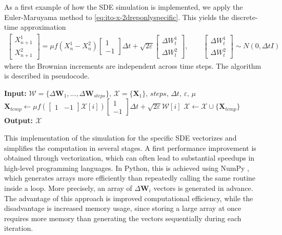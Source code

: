 \documentclass[11pt]{article}
\newcommand{\1}{\mathbbm{1}}
\theoremstyle{plain}
\theoremstyle{definition}
\theoremstyle{remark}
\begin{document}
As a first example of how the SDE simulation is implemented, we apply the Euler-Maruyama method to \eqref{eq:ito-x-2dreponlyspecific}. This yields the discrete-time approximation
\begin{align}
  \begin{bmatrix}
X_{n+1}^1 \\
 X_{n+1}^2
\end{bmatrix} = \mu f( X_n^1-X_n^2)\begin{bmatrix}
1 \\
-1
\end{bmatrix}\Delta t +\sqrt{2 \varepsilon} \begin{bmatrix}
\Delta W_t^1 \\
\Delta W_t^2
\end{bmatrix}  , \qquad \begin{bmatrix}
\Delta W_t^1 \\
\Delta W_t^2
\end{bmatrix} \sim N(0, \Delta t I)
\label{eq:ito-x-2dreponlyspecificEMapprox}
\end{align}
where the Brownian increments are independent across time steps. The algorithm is described in pseudocode. 
\FloatBarrier

\begin{algorithm}[h]
\caption{(Euler–Maruyama for \eqref{eq:ito-x-2dreponlyspecific})}\label{alg:placeholder}
\begin{algorithmic}[1]
\State \textbf{Input:} $\mathcal{W}=\{\Delta \mathbf{W}_1,..., \Delta \mathbf{W}_{steps}\}, \,  \mathcal{X}=\{\mathbf{X}_1\}, \, steps,  \, \Delta t, \, \varepsilon, \, \mu $ 
    \State $\mathbf{X}_{temp}\gets \mu f(\begin{bmatrix}
        1 & -1
    \end{bmatrix}\mathcal{X}[i]) \begin{bmatrix}
1 \\
-1
\end{bmatrix} \Delta t+\sqrt{2\varepsilon }\mathcal{W}[i]$ 
\State $\mathcal{X} \gets \mathcal{X} \cup \{ \mathbf{X}_{temp}\}$
\EndFor
\State \textbf{Output: $\mathcal{X}$} 
\end{algorithmic}
\end{algorithm}

This implementation of the simulation for the specific SDE vectorizes and simplifies the computation in several stages. A first performance improvement is obtained through vectorization, which can often lead to substantial speedups in high-level programming languages. In Python, this is achieved using NumPy \cite{harris2020array}, which generates arrays more efficiently than repeatedly calling the same routine inside a loop. More precisely, an array of $\Delta \mathbf{W}_i$ vectors is generated in advance. The advantage of this approach is improved computational efficiency, while the disadvantage is increased memory usage, since storing a large array at once requires more memory than generating the vectors sequentially during each iteration. 
\end{document}
